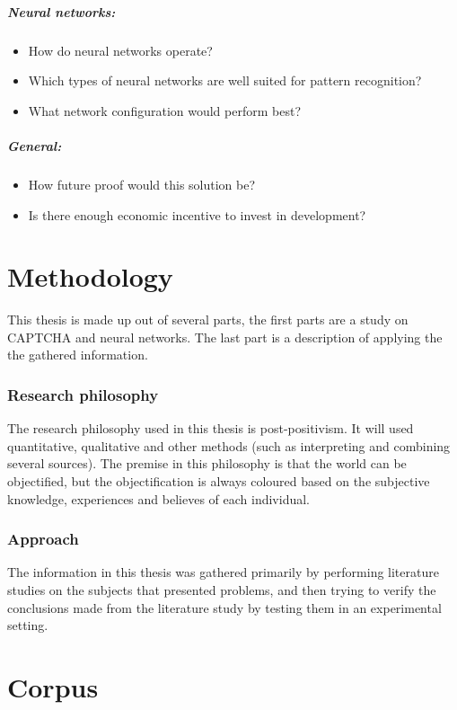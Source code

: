 \documentclass[pdftex,a4paper,12pt,twoside]{report}
\theoremstyle{plain} \newtheorem{theorem}{Theorem} \newtheorem{proposition}{Proposition} \newtheorem{lemma}{Lemma} \newtheorem*{corollary}{Corollary}
\theoremstyle{definition} \newtheorem{definition}{Definition} \newtheorem{conjecture}{Conjecture} \newtheorem*{example}{Example} \newtheorem{algorithm}{Algorithm}
\theoremstyle{remark} \newtheorem*{remark}{Remark} \newtheorem*{note}{Note} \newtheorem{case}{Case}
\begin{document}
\paragraph{Neural networks:}
\begin{itemize}
\item How do neural networks operate?
\item Which types of neural networks are well suited for pattern recognition?
\item What network configuration would perform best?
\end{itemize}
\paragraph{General:}
\begin{itemize}
\item How future proof would this solution be?
\item Is there enough economic incentive to invest in development?
\end{itemize}
\chapter{Methodology}
\label{ch:methodology}
This thesis is made up out of several parts, the first parts are a study on CAPTCHA and neural networks. The last part is a description of applying the the gathered information.
\subsection{Research philosophy}
The research philosophy used in this thesis is post-positivism. It will used quantitative, qualitative and other methods (such as interpreting and combining several sources). The premise in this philosophy is that the world can be objectified, but the objectification is always coloured based on the subjective knowledge, experiences and believes of each individual.
\subsection{Approach}
The information in this thesis was gathered primarily by performing literature studies on the subjects that presented problems, and then trying to verify the conclusions made from the literature study by testing them in an experimental setting.
\chapter{Corpus}
\label{ch:corpus}
\end{document}
